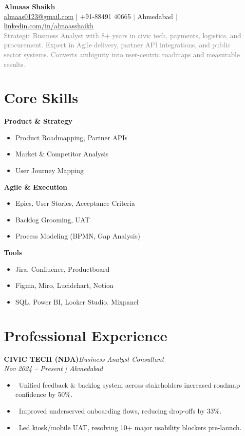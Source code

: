 \documentclass[11pt,a4paper]{article}
\newcommand{\resumeItem}[1]{\item \textbullet\ #1}
\begin{document}
\noindent
{\LARGE \textbf{Almaas Shaikh}} \\[2pt]
\href{mailto:almaas0123@gmail.com}{almaas0123@gmail.com} $\vert$ +91-88491 40665 $\vert$ Ahmedabad $\vert$
\href{https://linkedin.com/in/almaasshaikh}{linkedin.com/in/almaasshaikh} \\[6pt]
\textcolor{graytext}{Strategic Business Analyst with 8+ years in civic tech, payments, logistics, and procurement. Expert in Agile delivery, partner API integrations, and public sector systems. Converts ambiguity into user-centric roadmaps and measurable results.}

\section*{Core Skills}
\begin{multicols}{2}
\textbf{Product \& Strategy}
\begin{itemize}[leftmargin=*,noitemsep]
  \item Product Roadmapping, Partner APIs
  \item Market \& Competitor Analysis
  \item User Journey Mapping
\end{itemize}

\textbf{Agile \& Execution}
\begin{itemize}[leftmargin=*,noitemsep]
  \item Epics, User Stories, Acceptance Criteria
  \item Backlog Grooming, UAT
  \item Process Modeling (BPMN, Gap Analysis)
\end{itemize}

\textbf{Tools}
\begin{itemize}[leftmargin=*,noitemsep]
  \item Jira, Confluence, Productboard
  \item Figma, Miro, Lucidchart, Notion
  \item SQL, Power BI, Looker Studio, Mixpanel
\end{itemize}
\end{multicols}

\section*{Professional Experience}

\textbf{CIVIC TECH (NDA)}\hfill \textit{Business Analyst Consultant}\\
\textit{Nov 2024 – Present | Ahmedabad}
\begin{itemize}[leftmargin=*,noitemsep]
  \resumeItem{Unified feedback \& backlog system across stakeholders increased roadmap confidence by 50\%.}
  \resumeItem{Improved underserved onboarding flows, reducing drop-offs by 33\%.}
  \resumeItem{Led kiosk/mobile UAT, resolving 10+ major usability blockers pre-launch.}
\end{itemize}
\end{document}
